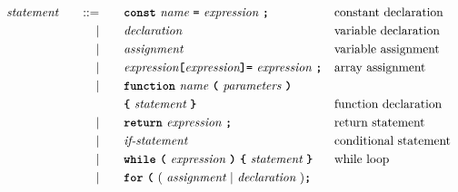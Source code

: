 \begin{alignat*}{9}
&& \textit{statement}    &&\quad ::= &\quad && \textbf{\texttt{const}}\  \textit{name} \ 
                                           \textbf{\texttt{=}}\  \textit{expression} \ \textbf{\texttt{;}}
                                                           && \textrm{constant declaration} \\
&&                       && |   &\quad && \textit{declaration} 
                                                           && \textrm{variable declaration} \\
&&                       && |   &\quad && \textit{assignment}
                                                           && \textrm{variable assignment} \\
&&                       && |   &\quad && \textit{expression} \textbf{\texttt{[}}
                                          \textit{expression} \textbf{\texttt{]}}
                                           \textbf{\texttt{=}}\  \textit{expression} \ \textbf{\texttt{;}}
                                                           && \textrm{array assignment} \\
&&                       && |   &\quad && \textbf{\texttt{function}}\  \textit{name} \ 
                                   \textbf{\texttt{(}}\  \textit{parameters} \ \textbf{\texttt{)}}\\
&&                       &&     &      && \textbf{\texttt{\{}}\  \textit{statement}   \ \textbf{\texttt{\}}} 
                                                           && \textrm{function declaration}\\
&&                       && |   &\quad && \textbf{\texttt{return}}\  \textit{expression} \ \textbf{\texttt{;}}
                                                           && \textrm{return statement}\\
&&                       && |   &\quad && \textit{if-statement} \quad
                                                           && \textrm{conditional statement}\\
&&                       && |   &\quad && \textbf{\texttt{while}}\  
                                   \textbf{\texttt{(}}\  \textit{expression} \ \textbf{\texttt{)}} \
                                   \textbf{\texttt{\{}}\  \textit{statement}   \ \textbf{\texttt{\}}} 
                                                           && \textrm{while loop}\\
&&                       && |   &\quad && \textbf{\texttt{for}}\ \textbf{\texttt{(}} \ 
                                          (\ \textit{assignment} \ | \  \textit{declaration}\ ) \textbf{\texttt{;}} \\

\end{alignat*}
